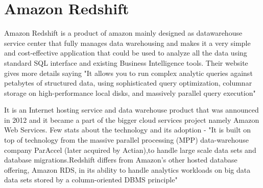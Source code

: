 \section{Amazon Redshift}

Amazon Redshift is a product of amazon mainly designed as datawarehouse service 
center that fully manages data warehousing and makes it a very simple and 
cost-effective application that could be used to analyze all the data using 
standard SQL interface and existing Business Intelligence tools. 
Their website gives more details saying "It allows you to run complex 
analytic queries against petabytes of structured data, using sophisticated 
query optimization, columnar storage on high-performance local disks, and 
massively parallel query execution"~\cite{Amazon Redshift}

It is an Internet hosting service and data warehouse product that was 
announced in 2012 and it became a part of the bigger cloud services 
project namely Amazon Web Services. Few stats about the technology and its adoption -
"It is built on top of technology from the massive parallel processing (MPP) 
data-warehouse company ParAccel (later acquired by Actian),to handle large 
scale data sets and database migrations.Redshift differs from Amazon's other hosted database offering, 
Amazon RDS, in its ability to handle analytics workloads on big data data sets 
stored by a column-oriented DBMS principle"~\cite{AmazonWiki}


